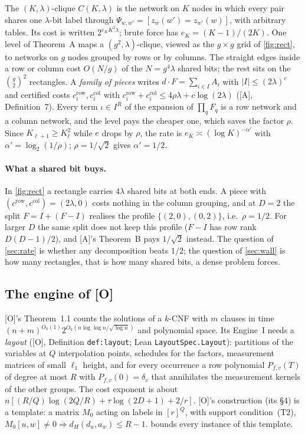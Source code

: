 \documentclass[10pt]{amsart}
\theoremstyle{plain}
\theoremstyle{definition}
\theoremstyle{remark}
\numberwithin{equation}{section}
\newcommand{\A}{\textup{[A]}}
\newcommand{\Oa}{\textup{[O]}}
\begin{document}
The $(K,\lambda)$-clique $C(K,\lambda)$ is the network on $K$ nodes in which every pair shares one
$\lambda$-bit label through $\Psi_{w,w'}=[z_w(w')=z_{w'}(w)]$, with arbitrary tables. Its cost is
written $2^{e_KK^2\lambda}$; brute force has $e_K=(K-1)/(2K)$. One level of Theorem~A maps a
$(g^2,\lambda)$-clique, viewed as the $g\times g$ grid of \cref{fig:rect}, to networks on $g$ nodes
grouped by rows or by columns. The straight edges inside a row or column cost $O(N/g)$ of the
$N=g^4\lambda$ shared bits; the rest sits on the $\binom g2^2$ rectangles. A \emph{family of pieces}
writes $d\cdot F=\sum_{i\in I}A_i$ with $|I|\le(2\lambda)^c$ and certified costs
$c^{\mathrm{row}}_i,c^{\mathrm{col}}_i$ with $c^{\mathrm{row}}_i+c^{\mathrm{col}}_i\le4\rho\lambda+c\log(2\lambda)$
(\A, Definition~7). Every term $\iota\in I^R$ of the expansion of $\prod_qF_q$ is a row network and a
column network, and the level pays the cheaper one, which saves the factor $\rho$. Since
$K_{\ell+1}\ge K_\ell^2$ while $e$ drops by $\rho$, the rate is $e_K\asymp(\log K)^{-\alpha'}$ with
$\alpha'=\log_2(1/\rho)$; $\rho=1/\sqrt2$ gives $\alpha'=1/2$.

\paragraph{What a shared bit buys.} In \cref{fig:rect} a rectangle carries $4\lambda$ shared bits at both
ends. A piece with $(c^{\mathrm{row}},c^{\mathrm{col}})=(2\lambda,0)$ costs nothing in the column grouping,
and at $D=2$ the split $F=I+(F-I)$ realises the profile $\{(2,0),(0,2)\}$, i.e.\ $\rho=1/2$. For
larger $D$ the same split does not keep this profile ($F-I$ has row rank $D(D-1)/2$), and \A's
Theorem~B pays $1/\sqrt2$ instead. The question of \cref{sec:rate} is whether any decomposition
beats $1/2$; the question of \cref{sec:wall} is how many rectangles, that is how many shared bits, a
dense problem forces.

\subsection{The engine of \Oa}
\Oa's Theorem~1.1 counts the solutions of a $k$-CNF with $m$ clauses in time
$(n+m)^{O_k(1)}2^{O_k(n\log\log n/\sqrt{\log n})}$ and polynomial space. Its Engine~I needs a
\emph{layout} (\Oa, Definition \texttt{def:layout}; Lean \texttt{LayoutSpec.Layout}): partitions of the
variables at $Q$ interpolation points, schedules for the factors, measurement matrices of small
$\ell_1$ height, and for every occurrence a row polynomial $P_{f,v}(T)$ of degree at most $R$ with
$P_{f,v}(0)=\delta_v$ that annihilates the measurement kernels of the other groups. The cost exponent
is about $n[(R/Q)\log(2Q/R)+\tau\log(2D+1)+2/r]$. \Oa's construction (its \S4) is a template: a
matrix $M_0$ acting on labels in $[r]^Q$, with support condition~(T2), $M_0[u,w]\ne0\Rightarrow
d_H(d_u,a_w)\le R-1$.  bounds every instance of this template.
\end{document}
